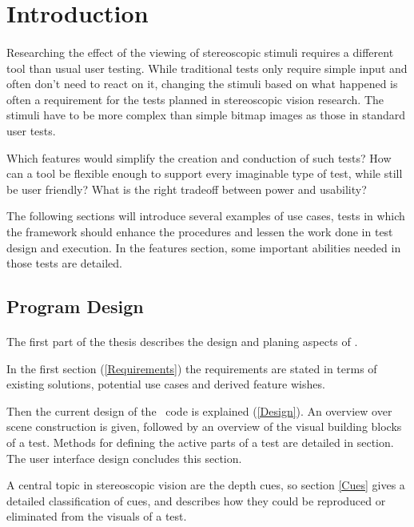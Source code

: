 \section{Introduction\label{Introduction}}
\paragraph{}
Researching the effect of the viewing of stereoscopic stimuli requires a different tool than usual user testing.
While traditional tests only require simple input and often don't need to react on it, changing the stimuli based on what happened is often a requirement for the tests planned in stereoscopic vision research.
The stimuli have to be more complex than simple bitmap images as those in standard user tests.

Which features would simplify the creation and conduction of such tests?
How can a tool be flexible enough to support every imaginable type of test, while still be user friendly?
What is the right tradeoff between power and usability?

The following sections will introduce several examples of use cases, tests in which the framework should enhance the procedures and lessen the work done in test design and execution.
In the features section, some important abilities needed in those tests are detailed.


\subsection{Program Design}
\paragraph{}
The first part of the thesis describes the design and planing aspects of \ER.

In the first section (\ref{Requirements}) the requirements are stated in terms of existing solutions, potential use cases and derived feature wishes.

Then the current design of the \ER\ code is explained (\ref{Design}).
An overview over scene construction is given, followed by an overview of the visual building blocks of a test.
Methods for defining the active parts of a test are detailed in section.
The user interface design concludes this section.

A central topic in stereoscopic vision are the depth cues, so section \ref{Cues} gives a detailed classification of cues, and describes how they could be reproduced or eliminated from the visuals of a test.


